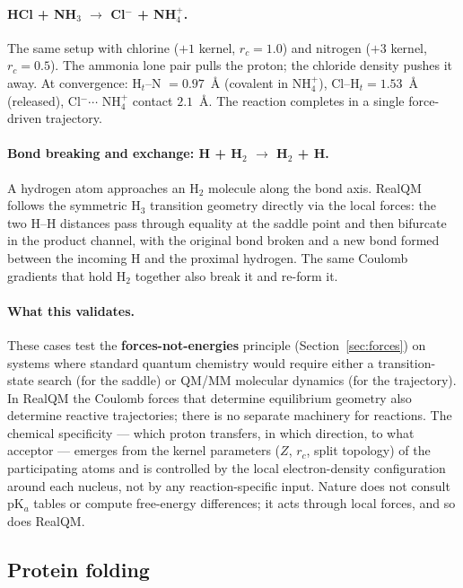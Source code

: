 \documentclass[11pt]{article}
\begin{document}
\paragraph{HCl + NH$_3$ $\to$ Cl$^-$ + NH$_4^+$.}
The same setup with chlorine ($+1$ kernel, $r_c = 1.0$) and nitrogen ($+3$ kernel, $r_c = 0.5$). The ammonia lone pair pulls the proton; the chloride density pushes it away. At convergence: H$_t$--N $= 0.97$~\AA{} (covalent in NH$_4^+$), Cl--H$_t = 1.53$~\AA{} (released), Cl$^- \cdots$ NH$_4^+$ contact $2.1$~\AA{}. The reaction completes in a single force-driven trajectory.

\paragraph{Bond breaking and exchange: H + H$_2$ $\to$ H$_2$ + H.}
A hydrogen atom approaches an H$_2$ molecule along the bond axis. RealQM follows the symmetric H$_3$ transition geometry directly via the local forces: the two H--H distances pass through equality at the saddle point and then bifurcate in the product channel, with the original bond broken and a new bond formed between the incoming H and the proximal hydrogen. The same Coulomb gradients that hold H$_2$ together also break it and re-form it.

\paragraph{What this validates.}
These cases test the \textbf{forces-not-energies} principle (Section~\ref{sec:forces}) on systems where standard quantum chemistry would require either a transition-state search (for the saddle) or QM/MM molecular dynamics (for the trajectory). In RealQM the Coulomb forces that determine equilibrium geometry also determine reactive trajectories; there is no separate machinery for reactions. The chemical specificity --- which proton transfers, in which direction, to what acceptor --- emerges from the kernel parameters ($Z$, $r_c$, split topology) of the participating atoms and is controlled by the local electron-density configuration around each nucleus, not by any reaction-specific input. Nature does not consult pK$_a$ tables or compute free-energy differences; it acts through local forces, and so does RealQM.

\subsection{Protein folding}\label{sec:proteins}
\end{document}
